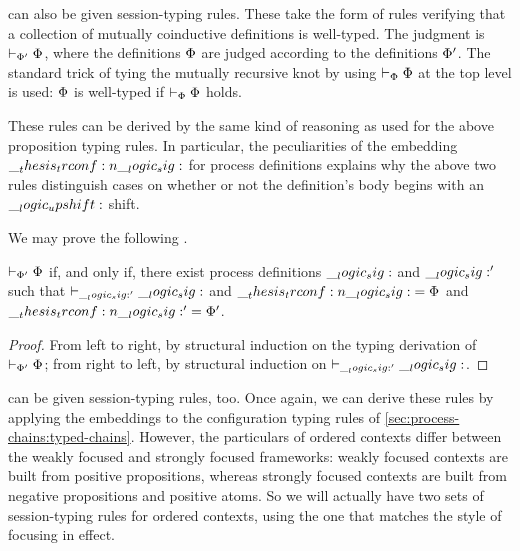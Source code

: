  can also be given session-typing rules.
These take the form of rules verifying that a collection of mutually coinductive definitions is well-typed.
The judgment is $\vdash_{\Phi'} \Phi$, where the definitions $\Phi$ are judged according to the definitions $\Phi'$.
The standard trick of tying the mutually recursive knot by using $\vdash_{\Phi} \Phi$ at the top level is used: $\Phi$ is well-typed if $\vdash_{\Phi} \Phi$ holds.
These rules can be derived by the same kind of reasoning as used for the above proposition typing rules.
In particular, the peculiarities of the embedding $\__thesis_trconf:n {\__logic_sig:}$ for process definitions explains why the above two rules distinguish cases on whether or not the definition's body begins with an $\__logic_upshift:$ shift.

We may prove the following .
\begin{theorem}\label{thm:embed:type-sig}
  $\vdash_{\Phi'} \Phi$ if, and only if, there exist process definitions $\__logic_sig:$ and $\__logic_sig:'$ such that $\vdash_{\__logic_sig:'} \__logic_sig:$ and $\__thesis_trconf:n {\__logic_sig:} = \Phi$ and $\__thesis_trconf:n {\__logic_sig:'} = \Phi'$.
\end{theorem}
\begin{proof}
  From left to right, by structural induction on the typing derivation of $\vdash_{\Phi'} \Phi$;
  from right to left, by structural induction on  $\vdash_{\__logic_sig:'} \__logic_sig:$.
\end{proof}


 can be given session-typing rules, too.
Once again, we can derive these rules by applying the embeddings to the configuration typing rules of \cref{sec:process-chains:typed-chains}.
However, the particulars of ordered contexts differ between the weakly focused and strongly focused frameworks: weakly focused contexts are built from positive propositions, whereas strongly focused contexts are built from negative propositions and positive atoms.
So we will actually have two sets of session-typing rules for ordered contexts, using the one that matches the style of focusing in effect.

